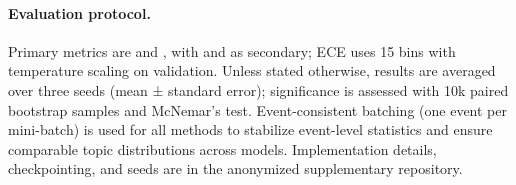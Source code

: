 \paragraph{Evaluation protocol.} Primary metrics are \metricMF{} and \metricPF{}, with \metricAcc{} and \metricECE{} as secondary; ECE uses 15 bins with temperature scaling on validation. Unless stated otherwise, results are averaged over three seeds (mean ± standard error); significance is assessed with 10k paired bootstrap samples and McNemar's test. Event-consistent batching (one event per mini-batch) is used for all methods to stabilize event-level statistics and ensure comparable topic distributions across models. Implementation details, checkpointing, and seeds are in the anonymized supplementary repository.
